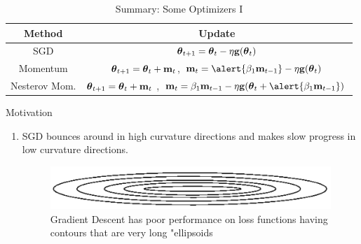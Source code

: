 \documentclass[xcolor=pdftex,dvipsnames,table,mathserif]{beamer}
\begin{document}
\begin{frame}
\begin{table}[htp]
\caption{Summary: Some Optimizers I}
\begin{center}
\begin{tabular}{|c|c|} \hline
Method & Update\\ \hline
SGD  & $\boldsymbol{\theta}_{t+1}= \boldsymbol{\theta}_{t}-\eta\mathbf{g}(\boldsymbol{\theta}_{t})$ \\ \hline
Momentum    & $\boldsymbol{\theta}_{t+1}= \boldsymbol{\theta}_{t}+\mathbf{m}_t$, $\mathbf{m}_{t}= \alert{\beta_1 \mathbf{m}_{t-1}} -\eta \mathbf{g}(\param_{t}) $ \\  \hline
Nesterov Mom.  &  $\boldsymbol{\theta}_{t+1}= \boldsymbol{\theta}_{t}+\mathbf{m}_t$ , $\mathbf{m}_t= \beta_1 \mathbf{m}_{t-1} -\eta\mathbf{g}(\param_{t}+ \alert{\beta_1 \mathbf{m}_{t-1}}) $ \\ \hline
\end{tabular}
\end{center}
\label{default}
\end{table}%
\end{frame}


\begin{frame}{Motivation}
\begin{enumerate}
\item SGD bounces around in high curvature directions and makes slow progress in low curvature directions. 
\begin{figure}
\includegraphics[width=.75\columnwidth]{../graphics/EllipsesValues}
\caption{Gradient Descent has poor performance on loss functions having contours that are very long "ellipsoids}
\end{figure}
\end{enumerate}
\end{frame}
\end{document}
